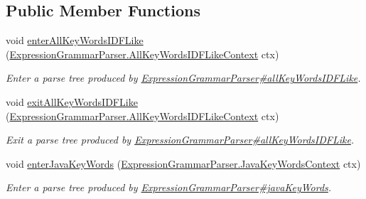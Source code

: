 \subsection*{Public Member Functions}
\begin{DoxyCompactItemize}
\item 
void \hyperlink{interfacegov_1_1nasa_1_1jpf_1_1inspector_1_1server_1_1expression_1_1parser_1_1_expression_grammar_listener_a470cdc067402d3fca5cce1c21deb6676}{enter\+All\+Key\+Words\+I\+D\+F\+Like} (\hyperlink{classgov_1_1nasa_1_1jpf_1_1inspector_1_1server_1_1expression_1_1parser_1_1_expression_grammar_pad664d42a2aee14226e172b869b9ffb3b}{Expression\+Grammar\+Parser.\+All\+Key\+Words\+I\+D\+F\+Like\+Context} ctx)
\begin{DoxyCompactList}\small\item\em Enter a parse tree produced by \hyperlink{classgov_1_1nasa_1_1jpf_1_1inspector_1_1server_1_1expression_1_1parser_1_1_expression_grammar_parser_abed0177f437ea92b0f2f8165987fdf59}{Expression\+Grammar\+Parser\#all\+Key\+Words\+I\+D\+F\+Like}. \end{DoxyCompactList}\item 
void \hyperlink{interfacegov_1_1nasa_1_1jpf_1_1inspector_1_1server_1_1expression_1_1parser_1_1_expression_grammar_listener_acd9d0c12b8e629a6b14df444d6e16206}{exit\+All\+Key\+Words\+I\+D\+F\+Like} (\hyperlink{classgov_1_1nasa_1_1jpf_1_1inspector_1_1server_1_1expression_1_1parser_1_1_expression_grammar_pad664d42a2aee14226e172b869b9ffb3b}{Expression\+Grammar\+Parser.\+All\+Key\+Words\+I\+D\+F\+Like\+Context} ctx)
\begin{DoxyCompactList}\small\item\em Exit a parse tree produced by \hyperlink{classgov_1_1nasa_1_1jpf_1_1inspector_1_1server_1_1expression_1_1parser_1_1_expression_grammar_parser_abed0177f437ea92b0f2f8165987fdf59}{Expression\+Grammar\+Parser\#all\+Key\+Words\+I\+D\+F\+Like}. \end{DoxyCompactList}\item 
void \hyperlink{interfacegov_1_1nasa_1_1jpf_1_1inspector_1_1server_1_1expression_1_1parser_1_1_expression_grammar_listener_a46a3a838a5b61e16337f58a72745198a}{enter\+Java\+Key\+Words} (\hyperlink{classgov_1_1nasa_1_1jpf_1_1inspector_1_1server_1_1expression_1_1parser_1_1_expression_grammar_parser_1_1_java_key_words_context}{Expression\+Grammar\+Parser.\+Java\+Key\+Words\+Context} ctx)
\begin{DoxyCompactList}\small\item\em Enter a parse tree produced by \hyperlink{classgov_1_1nasa_1_1jpf_1_1inspector_1_1server_1_1expression_1_1parser_1_1_expression_grammar_parser_ad2052f91a11b56131e3a746447f36634}{Expression\+Grammar\+Parser\#java\+Key\+Words}. \end{DoxyCompactList}\item 

\end{DoxyCompactItemize}
